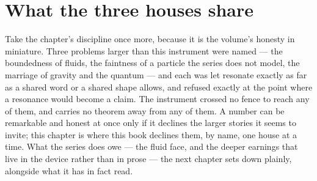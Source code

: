\section*{What the three houses share}

Take the chapter's discipline once more, because it is the volume's honesty
in miniature. Three problems larger than this instrument were named ---
the boundedness of fluids, the faintness of a particle the series does not
model, the marriage of gravity and the quantum --- and each was let
resonate exactly as far as a shared word or a shared shape allows, and
refused exactly at the point where a resonance would become a claim. The
instrument crossed no fence to reach any of them, and carries no theorem
away from any of them. A number can be remarkable and honest at once only
if it declines the larger stories it seems to invite; this chapter is where
this book declines them, by name, one house at a time. What the series does
owe --- the fluid face, and the deeper earnings that live in the device
rather than in prose --- the next chapter sets down plainly, alongside what
it has in fact read.
